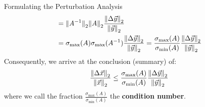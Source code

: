 \begin{ln-explain}{Formulating the Perturbation Analysis}{}
\begin{align*}
        &= {\| A^{-1} \|}_{2}^{} {\| A \|}_{2}^{} \frac{{\| \Delta \vec{y} \|}_{2}^{}}{{\| \vec{y} \|}_{2}^{}} \\
        &= \sigma_{\max}(A) \sigma_{\max}(A^{-1}) \frac{{\| \Delta \vec{y} \|}_{2}^{}}{{\| \vec{y} \|}_{2}^{}}
        = \frac{\sigma_{\max}(A)}{\sigma_{\min}(A)} \frac{{\| \Delta \vec{y} \|}_{2}^{}}{{\| \vec{y} \|}_{2}^{}}
    \end{align*}
    Consequently, we arrive at the conclusion (summary) of:
    \[
        \frac{{\| \Delta \vec{x} \|}_{2}^{}}{{\| \vec{x} \|}_{2}^{}} \leq \frac{\sigma_{\max}(A)}{\sigma_{\min}(A)} \frac{{\| \Delta \vec{y} \|}_{2}^{}}{{\| \vec{y} \|}_{2}^{}}
    \]
    where we call the fraction $\frac{\sigma_{\max}(A)}{\sigma_{\min}(A)}$ the \textbf{condition number}.
\end{ln-explain}
